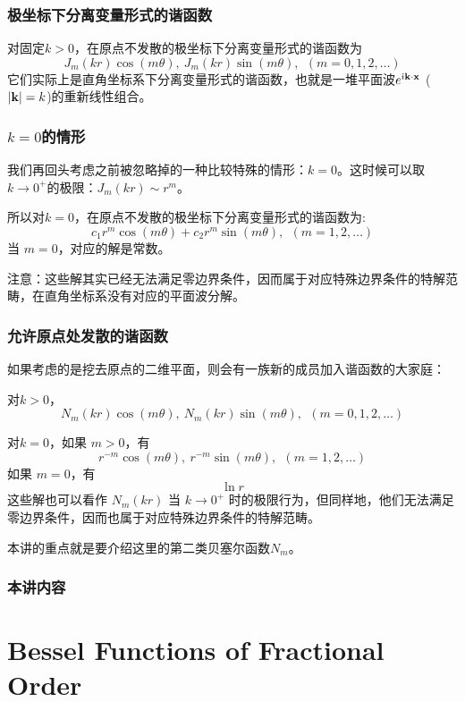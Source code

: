 \documentclass[CJK]{beamer}
\date{}
\begin{document}
  \bch
{}


\begin{frame}
  \frametitle{极坐标下分离变量形式的谐函数}
对固定$k>0$，在原点不发散的极坐标下分离变量形式的谐函数为
$$ J_m(kr)\cos(m\theta), \ J_m(kr)\sin(m\theta), \ \ (m=0,1,2,\ldots) $$
它们实际上是直角坐标系下分离变量形式的谐函数，也就是一堆平面波$e^{{\dot{\imath}} {\mathbf{k}} \cdot {\mathbf{x}}}$ ($|{\mathbf{k}}|=k$)的重新线性组合。
\end{frame}


\begin{frame}
  \frametitle{$k=0$的情形}
  我们再回头考虑之前被忽略掉的一种比较特殊的情形：$k=0$。这时候可以取$k\rightarrow 0^+$的极限：$ J_m(kr)\sim  r^m$。

  所以对$k=0$，在原点不发散的极坐标下分离变量形式的谐函数为:
  $$ c_1 r^m \cos(m\theta)+c_2 r^m \sin(m\theta), \ \ (m= 1,2,\ldots)$$
  当 $m=0$，对应的解是常数。 
  
  {\scriptsize 注意：这些解其实已经无法满足零边界条件，因而属于对应特殊边界条件的特解范畴，在直角坐标系没有对应的平面波分解。}
\end{frame}


\begin{frame}
  \frametitle{允许原点处发散的谐函数}
  如果考虑的是挖去原点的二维平面，则会有一族新的成员加入谐函数的大家庭：
  \bitem
\item{对$k>0$，
  $$N_m(kr)\cos(m\theta), \ N_m(kr)\sin(m\theta), \ \ (m=0,1,2,\ldots) $$}
\item{对$k=0$，如果 $m>0$，有
  $$r^{-m} \cos(m\theta), \ r^{-m} \sin(m\theta), \ \ (m=1,2,\ldots)$$
  如果 $m=0$，有
  $$\ln r$$
  {\scriptsize 这些解也可以看作 $N_m(kr)$ 当 $k\rightarrow 0^+$ 时的极限行为，但同样地，他们无法满足零边界条件，因而也属于对应特殊边界条件的特解范畴。}}
  \eitem

  本讲的重点就是要介绍这里的第二类贝塞尔函数$N_m$。
\end{frame}


\begin{frame}
\frametitle{本讲内容}

\tableofcontents
\end{frame}

\section{Bessel Functions of Fractional Order}
\end{document}
